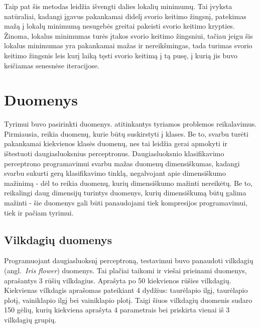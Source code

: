 \documentclass{VUMIFPSbakalaurinis}
\begin{document}
Taip pat šis metodas leidžia išvengti dalies lokalių minimumų.
Tai įvyksta natūraliai, kadangi įgavus pakankamai didelį svorio keitimo žingsnį, patekimas mažą į lokalų minimumą nesugebės greitai pakeisti svorio keitimo krypties.
Žinoma, lokalus minimumas turės įtakos svorio keitimo žingsniui, tačiau jeigu šis lokalus minimumas yra pakankamai mažas ir nereikšmingas, tada turimas svorio keitimo žingsnis leis kurį laiką tęsti svorio keitimą į tą pusę, į kurią jis buvo keičiamas senesnėse iteracijose.




\section{Duomenys}

Tyrimui buvo pasirinkti duomenys. atitinkantys tyriamos problemos reikalavimus.
Pirmiausia, reikia duomenų, kurie būtų suskirstyti į klases.
Be to, svarbu turėti pakankamai kiekvienos klasės duomenų, nes tai leidžia gerai apmokyti ir ištestuoti daugiasluoksnius perceptronus.
Daugiasluoksnio klasifikavimo perceptrono programavimui svarbu mažas duomenų dimensiškumas, kadangi svarbu sukurti gerą klasifikavimo tinklą, negalvojant apie dimensiškumo mažinimą - dėl to reikia duomenų, kurių dimensiškumo mažinti nereikėtų.
Be to, reikalingi daug dimensijų turintys duomenys, kurių dimensiškumą būtų galima mažinti - šie duomenys gali būti panaudojami tiek kompresijos programavimui, tiek ir pačiam tyrimui.



\subsection{Vilkdagių duomenys}

Programuojant daugiasluoksnį perceptroną, testavimui buvo panaudoti vilkdagių (angl.~\textit{Iris flower}) duomenys.
Tai plačiai taikomi ir viešai prieinami duomenys, aprašantys 3 rūšių vilkdagius.
Aprašyta po 50 kiekvienos rūšies vilkdagių.
Kiekvienas vilkdagis aprašomas pateikiant 4 dydžius: taurėlapio ilgį, taurėlapio plotį, vainiklapio ilgį bei vainiklapio plotį.
Taigi šiuos vilkdagių duomenis sudaro 150 gėlių, kurių kiekviena aprašyta 4 parametrais bei priskirta vienai iš 3 vilkdagių grupių.
\end{document}
